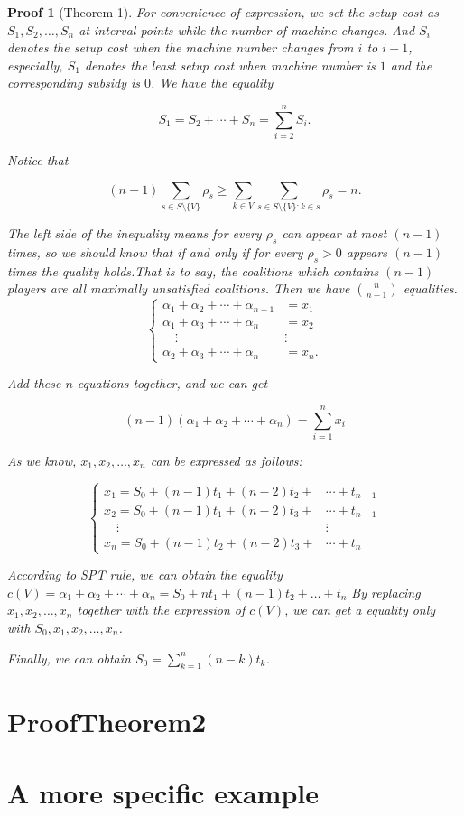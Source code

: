\documentclass[UTF8]{article}
\newtheorem{pf}{Proof}
\begin{document}
\begin{pf}[Theorem 1]

For convenience of expression, we set the setup cost as $S_{1},S_{2}, \dots ,S_{n}$ at interval points while the number of machine changes.
And $S_{i}$ denotes the setup cost when the machine number changes from $i$ to $i-1$, especially, $S_{1}$ denotes the least setup cost when machine number is $1$ and the corresponding subsidy is $0$.
We have the equality

\begin{displaymath}
  S_{1}=S_{2}+\cdots+S_{n}=\sum_{i=2}^n S_i.
\end{displaymath}

Notice that

\begin{displaymath}
  (n-1) \sum_{s \in S \setminus\{V\} } \rho_s \geq
  \sum_{k\in V}\sum_{s \in S \setminus\{V\}:k \in s} \rho_s = n.
\end{displaymath}

The left side of the inequality means for every $\rho_s$ can appear at most $(n-1)$ times, so we should know that if and only if for every $\rho_s > 0$ appears $(n-1)$ times the quality holds.That is to say, the coalitions which contains $(n-1)$ players are all maximally unsatisfied coalitions. Then we have $n \choose n-1$ equalities.
\[
\begin{cases}
 \alpha_1+\alpha_2+ \cdots+\alpha_{n-1} & = x_1 \\
 \alpha_1+\alpha_3+ \cdots+\alpha_n & = x_2 \\
 \quad   \vdots        &\vdots\\
 \alpha_2+\alpha_3+ \cdots+\alpha_n & = x_n.
\end{cases}
\]

Add these $n$ equations together, and we can get

\begin{equation*}
  (n-1)(\alpha_1+\alpha_2+ \cdots+\alpha_n)=\sum_{i=1}^{n}x_i
\end{equation*}

As we know, $x_1,x_2,\dots,x_n$ can be expressed as follows:

\[
\begin{cases}
x_1 = S_0 + (n-1)t_1 + (n-2)t_2 + &\cdots + t_{n-1} \\
x_2 = S_0 + (n-1)t_1 + (n-2)t_3 + &\cdots + t_{n-1} \\
\quad   \vdots        &\vdots\\
x_n = S_0 + (n-1)t_2 + (n-2)t_3 + &\cdots + t_{n}
\end{cases}
\]

According to SPT rule, we can obtain the equality
$c(V)=\alpha_1+\alpha_2+\cdots+\alpha_n=S_0+nt_1+(n-1)t_2+\dots+t_n$
By replacing $x_1,x_2,\dots,x_n$ together with the expression of $c(V)$, we can get a equality only with $S_0,x_1,x_2,\dots,x_n$.

Finally, we can obtain $S_0 = \sum_{k=1}^n (n-k)t_k$.
\end{pf}

\section{ProofTheorem2}



\section{A more specific example}
\end{document}
